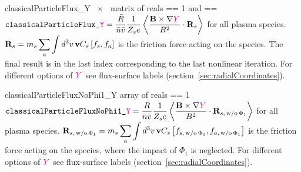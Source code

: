 \myhrule

{classicalParticleFlux_Y}
{~$\times$~ matrix of reals}
{ == 1 and  == \true}
{$\displaystyle \text{\ttfamily classicalParticleFlux\_\textcolor{magenta}{Y}} = \frac{\bar{R}}{\bar{n} \bar{v}} \frac{1}{Z_s e} \left\langle \frac{{\mathbf B} \times \nabla \textcolor{magenta}{Y}}{B^2} \cdot {\mathbf R}_s \right\rangle$ for all plasma species. $\displaystyle {\mathbf R}_s = m_s \sum_a \int d^3v \, {\mathbf v} C_s \left[f_s, f_a\right]$ is the friction force acting on the species. The final result is in the last index corresponding to the last nonlinear iteration.\newline
For different options of $\textcolor{magenta}{Y}$ see flux-surface labels (section~\ref{sec:radialCoordinates}).}

\myhrule

{classicalParticleFluxNoPhi1_Y}
{ array of reals}
{ == 1}
{$\displaystyle \text{\ttfamily classicalParticleFluxNoPhi1\_\textcolor{magenta}{Y}} = \frac{\bar{R}}{\bar{n} \bar{v}} \frac{1}{Z_s e} \left\langle \frac{{\mathbf B} \times \nabla \textcolor{magenta}{Y}}{B^2} \cdot {\mathbf R}_{s,\,\mathrm{w/o}\,\Phi_1} \right\rangle$ for all plasma species. $\displaystyle {\mathbf R}_{s,\,\mathrm{w/o}\,\Phi_1} = m_s \sum_a \int d^3v \, {\mathbf v} C_s \left[f_{s,\,\mathrm{w/o}\,\Phi_1}, f_{a,\,\mathrm{w/o}\,\Phi_1}\right]$ is the friction force acting on the species, where the impact of $\Phi_1$ is neglected.\newline
For different options of $\textcolor{magenta}{Y}$ see flux-surface labels (section~\ref{sec:radialCoordinates}).}

\myhrule

%

